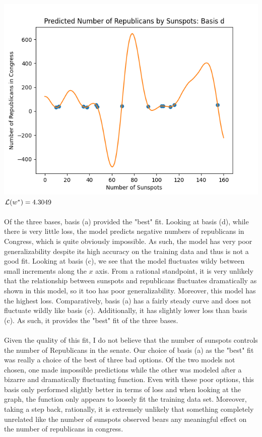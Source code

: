 \documentclass[submit]{harvardml}
\begin{document}
\includegraphics[scale=0.75]{sunspotd.png}\\

\textbf{$\mathcal{L}(w^*) = 4.3049$} \\ \\
Of the three bases, basis (a) provided the "best" fit. Looking at basis (d), while there is very little loss, the model predicts negative numbers of republicans in Congress, which is quite obviously impossible. As such, the model has very poor generalizability despite its high accuracy on the training data and thus is not a good fit. Looking at basis (c), we see that the model fluctuates wildy between small increments along the $x$ axis. From a rational standpoint, it is very unlikely that the relationship between sunspots and republicans fluctuates dramatically as shown in this model, so it too has poor generalizability. Moreover, this model has the highest loss. Comparatively, basis (a) has a fairly steady curve and does not fluctuate wildly like basis (c). Additionally, it has slightly lower loss than basis (c). As such, it provides the "best" fit of the three bases. \\ \\
Given the quality of this fit, I do not believe that the number of sunspots controls the number of Republicans in the senate. Our choice of basis (a) as the "best" fit was really a choice of the best of three bad options. Of the two models not chosen, one made impossible predictions while the other was modeled after a bizarre and dramatically fluctuating function. Even with these poor options, this basis only performed slightly better in terms of loss and when looking at the graph, the function only appears to loosely fit the training data set. Moreover, taking a step back, rationally, it is extremely unlikely that something completely unrelated like the number of sunspots observed bears any meaningful effect on the number of republicans in congress.
\end{document}
